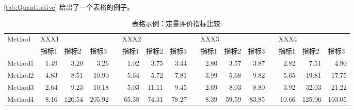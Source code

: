 \documentclass[a4paper,zihao=-4]{article}
\begin{document}
\begin{CJK*}{UTF8}{gbsn}
\cref{tab:Quantitative} 给出了一个表格的例子。

\begin{table}[htb!]
	\centering
	\setlength{\tabcolsep}{2pt}
	\scriptsize
	\caption{表格示例：定量评价指标比较.}
	\begin{tabular}{lrrrrrrrrrrrrrrr}
		\toprule
		Method & \multicolumn{3}{l}{XXX1} & & \multicolumn{3}{l}{XXX2} & & \multicolumn{3}{l}{XXX3} & & \multicolumn{3}{l}{XXX4} \\ 
		\cmidrule{2-4} \cmidrule{6-8} \cmidrule{10-12} \cmidrule{14-16}
		        & \multicolumn{1}{l}{指标1} & \multicolumn{1}{l}{指标2} & \multicolumn{1}{l}{指标3} &           & \multicolumn{1}{l}{指标1} & \multicolumn{1}{l}{指标2} & \multicolumn{1}{l}{指标3} &           & \multicolumn{1}{l}{指标1} & \multicolumn{1}{l}{指标2} & \multicolumn{1}{l}{指标3} &           & \multicolumn{1}{l}{指标1} & \multicolumn{1}{l}{指标2} & \multicolumn{1}{l}{指标3} \\
		\midrule          
		Method1 & 1.49                        & 3.20                        & 3.26                        &           & 1.02                        & 3.75                        & 3.44                        &           & 2.80                        & 3.57                        & 3.87                        &           & 2.82                        & 7.51                        & 4.90                        \\
		Method2 & 4.83                        & 8.51                        & 10.90                       &           & 5.64                        & 5.72                        & 7.81                        &           & 3.99                        & 5.68                        & 9.82                        &           & 5.65                        & 19.81                       & 17.75                       \\
		Method3 & 2.64                        & 9.23                        & 10.18                       &           & 5.03                        & 11.11                       & 9.45                        &           & 2.69                        & 8.03                        & 8.80                        &           & 3.92                        & 32.03                       & 21.22                       \\
		Method4 & 8.16                        & 120.54                      & 205.92                      &           & 65.38                       & 74.31                       & 78.27                       &           & 8.39                        & 59.59                       & 83.85                       &           & 10.66                       & 125.06                      & 103.05                      \\

\end{tabular}
\end{table}
\end{CJK*}
\end{document}

